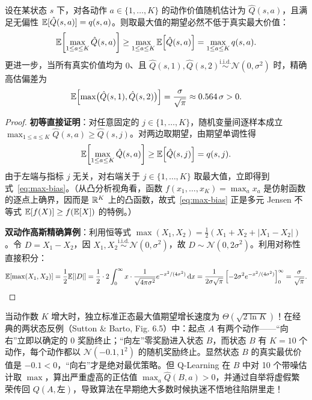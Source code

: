 \begin{thmBox}
\begin{theorem}
\label{thm:max-bias}
设在某状态 $s$ 下，对各动作 $a \in \{1, \dots, K\}$ 的动作价值随机估计为 $\hat{Q}(s, a)$，且满足无偏性 $\mathbb{E}[\hat{Q}(s, a)] = q(s, a)$。则取最大值的期望必然不低于真实最大价值：
\begin{equation}
  \mathbb{E}\!\left[\max_{1 \le a \le K} \hat{Q}(s, a)\right] \ge \max_{1 \le a \le K} \mathbb{E}\!\left[\hat{Q}(s, a)\right] = \max_{1 \le a \le K} q(s, a).
  \label{eq:max-bias}
\end{equation}
更进一步，当所有真实价值均为 $0$、且 $\hat{Q}(s, 1), \hat{Q}(s, 2) \stackrel{\text{i.i.d.}}{\sim} \mathcal{N}(0, \sigma^2)$ 时，精确高估偏差为
\[
  \mathbb{E}\!\left[\max\!\big(\hat{Q}(s,1), \hat{Q}(s,2)\big)\right] = \frac{\sigma}{\sqrt{\pi}} \approx 0.564\,\sigma > 0.
\]
\end{theorem}
\begin{proof}
\textbf{初等直接证明}：对任意固定的 $j \in \{1, \dots, K\}$，随机变量间逐样本成立 $\max_{1 \le a \le K} \hat{Q}(s, a) \ge \hat{Q}(s, j)$。对两边取期望，由期望单调性得
\[
  \mathbb{E}\!\left[\max_{1 \le a \le K} \hat{Q}(s, a)\right] \ge \mathbb{E}\!\left[\hat{Q}(s, j)\right] = q(s, j).
\]
由于左端与指标 $j$ 无关，对右端关于 $j \in \{1, \dots, K\}$ 取最大值，立即得到式~\eqref{eq:max-bias}。（从凸分析视角看，函数 $f(x_1, \dots, x_K) = \max_a x_a$ 是仿射函数的逐点上确界，因而是 $\mathbb{R}^K$ 上的凸函数，故式~\eqref{eq:max-bias} 正是多元 Jensen 不等式 $\mathbb{E}[f(X)] \ge f(\mathbb{E}[X])$ 的特例。）

\textbf{双动作高斯精确算例}：利用恒等式 $\max(X_1, X_2) = \frac{1}{2}(X_1 + X_2 + |X_1 - X_2|)$。令 $D = X_1 - X_2$，因 $X_1, X_2 \stackrel{\text{i.i.d.}}{\sim} \mathcal{N}(0, \sigma^2)$，故 $D \sim \mathcal{N}(0, 2\sigma^2)$。利用对称性直接积分：
\[
  \mathbb{E}[\max(X_1, X_2)]
  = \frac{1}{2}\mathbb{E}[|D|]
  = \frac{1}{2} \cdot 2 \int_0^{\infty} x \cdot \frac{1}{\sqrt{4\pi\sigma^2}} e^{-x^2/(4\sigma^2)}\,\mathrm{d}x
  = \frac{1}{2\sigma\sqrt{\pi}} \left[-2\sigma^2 e^{-x^2/(4\sigma^2)}\right]_0^{\infty}
  = \frac{\sigma}{\sqrt{\pi}}. \qedhere
\]
\end{proof}
\end{thmBox}

当动作数 $K$ 增大时，独立标准正态最大值期望增长速度为 $\Theta(\sqrt{2 \ln K})$！在经典的两状态反例（Sutton \& Barto, Fig. 6.5）中：起点 $A$ 有两个动作——“向右”立即以确定的 $0$ 奖励终止；“向左”零奖励进入状态 $B$，而状态 $B$ 有 $K = 10$ 个动作，每个动作都以 $\mathcal{N}(-0.1, 1^2)$ 的随机奖励终止。显然状态 $B$ 的真实最优价值是 $-0.1 < 0$，“向右”才是绝对最优策略。但 Q-Learning 在 $B$ 中对 10 个带噪估计取 $\max$，算出严重虚高的正估值 $\max_a \hat{Q}(B, a) > 0$，并通过自举将虚假繁荣传回 $Q(A, \text{左})$，导致算法在早期绝大多数时候执迷不悟地往陷阱里走！

